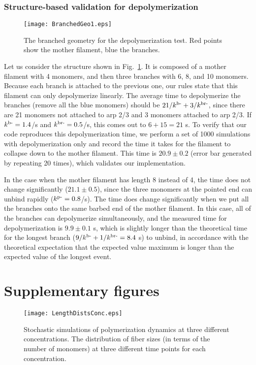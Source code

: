 \documentclass[11pt]{article}
\begin{document}
\begin{appendices}
\subsubsection{Structure-based validation for depolymerization}
\begin{figure}
\centering
\texttt{[image: BranchedGeo1.eps]}
\caption{\label{fig:BranchedGeo}The branched geometry for the depolymerization test. Red points show the mother filament, blue the branches.}
\end{figure}

Let us consider the structure shown in Fig.\ \ref{fig:BranchedGeo}. It is composed of a mother filament with 4 monomers, and then three branches with 6, 8, and 10 monomers. Because each branch is attached to the previous one, our rules state that this filament can only depolymerize linearly. The average time to depolymerize the branches (remove all the blue monomers) should be $21/k^\text{b-}+3/k^\text{br-}$, since there are 21 monomers not attached to arp 2/3 and 3 monomers attached to arp 2/3. If $k^\text{b-}=1.4$/s and $k^\text{br-}=0.5$/s, this comes out to $6+15=21$ s. To verify that our code reproduces this depolymerization time, we perform a set of 1000 simulations with depolymerization only and record the time it takes for the filament to collapse down to the mother filament. This time is $20.9 \pm 0.2$ (error bar generated by repeating 20 times), which validates our implementation. 

In the case when the mother filament has length 8 instead of 4, the time does not change significantly ($21.1 \pm 0.5$), since the three monomers at the pointed end can unbind rapidly ($k^\text{p-}=0.8$/s). The time does change significantly when we put all the branches onto the same barbed end of the mother filament. In this case, all of the branches can depolymerize simultaneously, and the measured time for depolymerization is $9.9 \pm 0.1$ s, which is slightly longer than the theoretical time for the longest branch ($9/k^\text{b-}+1/k^\text{br-}=8.4$ s) to unbind, in accordance with the theoretical expectation that the expected value maximum is longer than the expected value of the longest event.


\section{Supplementary figures}
\begin{figure}
\texttt{[image: LengthDistsConc.eps]}
\caption{\label{fig:FibSizesSA}Stochastic simulations of polymerization dynamics at three different concentrations. The distribution of fiber sizes (in terms of the number of monomers) at three different time points for each concentration.}
\end{figure}


\end{appendices}
\end{document}

